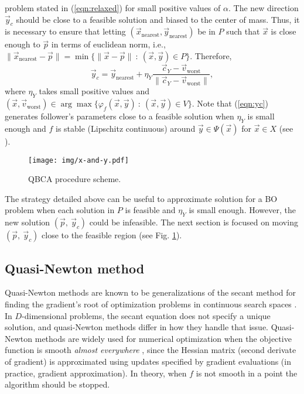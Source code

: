 \documentclass[conference]{IEEEtran}
\theoremstyle{definition}
\begin{document}
problem stated in (\ref{eqn:relaxed}) for small positive values of $\alpha$.
% 
The new direction $\vec{y}_c$ should be close to a feasible solution and biased
to the center of mass. Thus, it is necessary to ensure that letting
$(\vec{x}_\text{nearest}, \vec{y}_{\text{nearest}}) $ be in $P$ such that $\vec{x}$
is close enough to $\vec{p}$ in terms of euclidean norm, i.e.,
$ \| \vec{x}_{\text{nearest}} - \vec{p} \| = \min\{ \| \vec{x} - \vec{p} \| \ : \ (\vec{x}, \vec{y}) \in P  \} $.
Therefore,
% 
\begin{equation}
    \vec{y}_c = \vec{y}_{\text{nearest}} + \eta_{Y} \dfrac{\vec{c}_Y - \vec{v}_{\text{worst}}}{\| \vec{c}_Y - \vec{v}_{\text{worst}} \|},
    \label{eqn:yc}
\end{equation} %
% 
where $\eta_Y$ takes small positive values and 
% 
$
    (\vec{x}, \vec{v}_{\text{worst}}) \in \arg \max \{\varphi_f(\vec{x}, \vec{y} )  \ : \ (\vec{x}, \vec{y}) \in V \}
$. Note that (\ref{eqn:yc}) generates follower's parameters close to a feasible
solution when $\eta_{Y}$ is small enough and $f$ is stable (Lipschitz continuous)
around $\vec{y} \in \Psi(\vec{x}) $ for  $\vec{x} \in X$ (see \cite{dempe2002foundations}). %
% 

% 
\begin{figure}[t]
    \centering
    \texttt{[image: img/x-and-y.pdf]}
    \caption{QBCA procedure scheme.}
    \label{fig:qca}
\end{figure}
% 
The strategy detailed above can be useful to approximate solution for a BO problem
when each solution in  $P$ is feasible and $\eta_{Y}$ is small enough. However,
the new solution $(\vec{p},\ \vec{y}_c)$ could be infeasible. The next section
is focused on moving $(\vec{p},\ \vec{y}_c)$ close to the feasible region
(see Fig. \ref{fig:qca}).


\subsection{Quasi-Newton method} %
\label{sub:nonsmooth_optimization_via_bfgs}

Quasi-Newton methods are known to be generalizations of the secant method for
finding the gradient's root of optimization problems in continuous search spaces \cite{fletcher2013practical,liu1989limited}.
In $D$-dimensional problems, the secant equation does not specify a unique solution,
and quasi-Newton methods differ in how they handle that issue. Quasi-Newton methods
are widely used for numerical optimization when the objective function is smooth
\textit{almost everywhere} \cite{lewis2013nonsmooth}, since the Hessian matrix
(second derivate of gradient) is approximated using updates specified by gradient
evaluations (in practice, gradient approximation). In theory, when $f$ is not
smooth in a point the algorithm should be stopped. 
\end{document}
